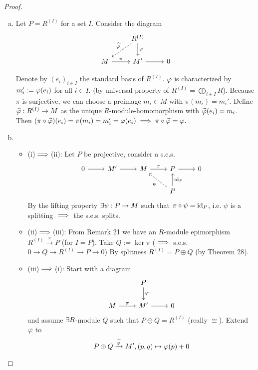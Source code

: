 \documentclass[a4paper]{report}
\begin{document}
\begin{proof}
\begin{enumerate}[(a)]
  \item Let $P = R^{(I)}$ for a set $I$. Consider the diagram
        \[\begin{tikzcd}
                   & R^{(I)} \arrow[ld, "\hat \varphi"', dashed] \arrow[d, "\varphi"] &   \\
M \arrow[r, "\pi"] & M' \arrow[r]                                                     & 0
\end{tikzcd}\]

        Denote by $(e_{i})_{i \in I}$ the standard basis of $R^{(I)}$. $\varphi$ is characterized by $m_{i}' := \varphi(e_{i})$ for all $ i \in I$. (by universal property of $R^{(I)} = \bigoplus_{i \in I} R$). Because $\pi$ is surjective, we can choose a preimage $m_{i} \in M$ with $\pi(m_{i}) = m_{i}'$. Define $\widehat {\varphi}: R^{(I)} \to M$ as the unique $R$-module-homomorphism with $\widehat {\varphi}(e_{i}) = m_{i}$. Then $(\pi \circ \widehat {\varphi})(e_{i}) = \pi(m_{i}) = m_{i}' = \varphi(e_{i}) \implies \pi \circ \widehat {\varphi} = \varphi.$
  \item
        \begin{itemize}
          \item (i)$\implies$(ii): Let $P$ be projective, consider a s.e.s.
                \[\begin{tikzcd}
0 \arrow[r] & M' \arrow[r] & M \arrow[r, "\pi"] & P \arrow[r]                                      & 0 \\
            &              &                    & P \arrow[u, "\id_P"'] \arrow[lu, "\psi", dashed] &
          \end{tikzcd}\]
                By the lifting property $\exists \psi: P \to M$ such that $\pi \circ \psi = \operatorname{id}_{P}$, i.e. $\psi$ is a splitting $\implies$ the s.e.s. splits.
          \item (ii)$\implies$(iii): From Remark 21 we have an $R$-module epimorphism $R^{(I)} \xrightarrow \pi P$ (for $I = P$). Take $Q:= \ker \pi$ ($\implies$ s.e.s. $0 \to Q \to R^{(I)} \to P \to 0$) By splitness $R^{(I)} = P \oplus Q$ (by Theorem 28).
          \item (iii)$\implies$(i): Start with a diagram
                \[\begin{tikzcd}
                   & P \arrow[d, "\ph"] &   \\
M \arrow[r, "\pi"] & M' \arrow[r]       & 0
\end{tikzcd}\]
                and assume $\exists R$-module $Q$ such that $P \oplus Q = R^{(I)}$ (really $\cong$). Extend $\varphi$ to \[P \oplus Q \xrightarrow {\widetilde {\varphi}} M', (p,q) \mapsto \varphi(p) + 0\]

\end{itemize}
\end{enumerate}
\end{proof}
\end{document}
